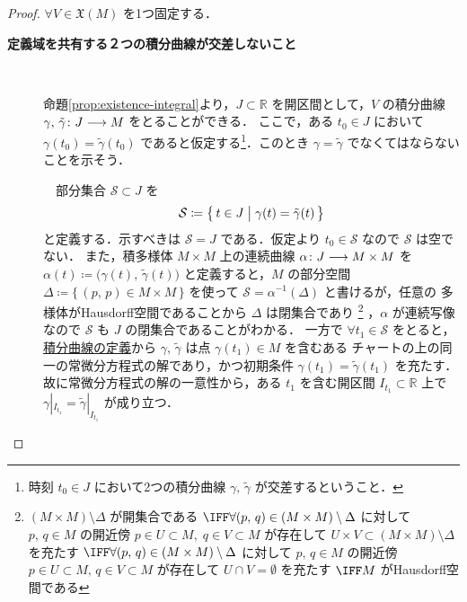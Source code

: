 \documentclass[geometry_main]{subfiles}
\begin{document}
\begin{proof}
    $\forall V \in \mathfrak{X}(M)$ を1つ固定する．
    \begin{description}
        \item[\textbf{定義域を共有する２つの積分曲線が交差しないこと}]　
        
        命題\ref{prop:existence-integral}より，$J \subset \mathbb{R}$ を開区間として，$V$ の積分曲線 $\gamma,\, \tilde{\gamma} \colon J \longrightarrow M$ をとることができる．
        ここで，ある $t_0 \in J$ において $\gamma(t_0) = \tilde{\gamma} (t_0)$ であると仮定する\footnote{時刻 $t_0 \in J$ において2つの積分曲線 $\gamma,\, \tilde{\gamma}$ が交差するということ．}．このとき $\gamma = \tilde{\gamma}$ でなくてはならないことを示そう．

        　部分集合 $\mathcal{S} \subset J$ を
        \begin{align}
            \mathcal{S} \coloneqq \bigl\{\, t \in J \bigm| \gamma(t) = \tilde{\gamma}(t) \,\bigr\} 
        \end{align}
        と定義する．示すべきは $\mathcal{S} = J$ である．仮定より $t_0 \in \mathcal{S}$ なので $\mathcal{S}$ は空でない．
        また，積多様体 $M \times M$ 上の連続曲線 $\alpha \colon J \longrightarrow M \times M$ を $\alpha(t) \coloneqq \bigl( \gamma(t),\, \tilde{\gamma}(t) \bigr)$ と定義すると，$M$ の部分空間 $\Delta \coloneqq \bigl\{\, (p,\, p) \in M \times M \,\bigr\}$ を使って $\mathcal{S} = \alpha^{-1}(\Delta)$ と書けるが，任意の \cinfty 多様体がHausdorff空間であることから $\Delta$ は閉集合であり
        \footnote{$(M \times M) \setminus \Delta$ が開集合である $\IFF \forall (p,\, q) \in (M \times M) \setminus \Delta$ に対して $p,\, q \in M$ の開近傍 $p \in U \subset M,\; q \in V \subset M$ が存在して $U \times V \subset (M \times M) \setminus \Delta$ を充たす $\IFF \forall (p,\, q) \in (M \times M) \setminus \Delta$ に対して $p,\, q \in M$ の開近傍 $p \in U \subset M,\, q \in V \subset M$ が存在して $U \cap V = \emptyset$ を充たす $\IFF M$ がHausdorff空間である}
        ，$\alpha$ が連続写像なので $\mathcal{S}$ も $J$ の閉集合であることがわかる．
        一方で $\forall t_1 \in \mathcal{S}$ をとると，\hyperref[def:integral-curve]{積分曲線の定義}から $\gamma,\, \tilde{\gamma}$ は点 $\gamma(t_1) \in M$ を含むある \cinfty チャートの上の同一の常微分方程式の解であり，かつ初期条件 $\gamma(t_1) = \tilde{\gamma}(t_1)$ を充たす．故に常微分方程式の解の一意性から，ある $t_1$ を含む開区間 $I_{t_1} \subset \mathbb{R}$ 上で $\gamma|_{I_{t_1}} = \tilde{\gamma}|_{I_{t_1}}$ が成り立つ．

\end{description}
\end{proof}
\end{document}
